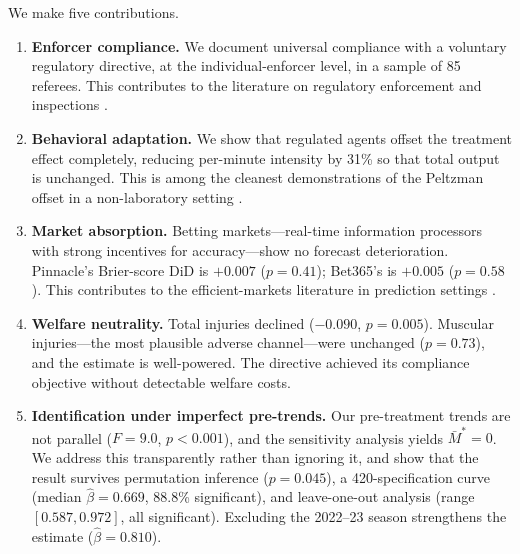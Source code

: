 We make five contributions.
%
\begin{enumerate}[label=(\roman*)]

\item \textbf{Enforcer compliance.}
We document universal compliance with a voluntary regulatory directive,
at the individual-enforcer level, in a sample of 85 referees.
This contributes to the literature on regulatory enforcement and
inspections \citep{DufloGreenstoneHanna2013,DimantTosato2018}.

\item \textbf{Behavioral adaptation.}
We show that regulated agents offset the treatment effect completely,
reducing per-minute intensity by 31\% so that total output is unchanged.
This is among the cleanest demonstrations of the Peltzman offset
in a non-laboratory setting \citep{Peltzman1975,VisscherSi1997}.

\item \textbf{Market absorption.}
Betting markets---real-time information processors with strong
incentives for accuracy---show no forecast deterioration.
Pinnacle's Brier-score DiD is $+0.007$ ($p=0.41$); Bet365's is
$+0.005$ ($p=0.58$).
This contributes to the efficient-markets literature in prediction
settings \citep{Thaler1988,GilMollaPazZone2019}.

\item \textbf{Welfare neutrality.}
Total injuries declined ($-0.090$, $p=0.005$).
Muscular injuries---the most plausible adverse channel---were
unchanged ($p=0.73$), and the estimate is well-powered.
The directive achieved its compliance objective without detectable
welfare costs.

\item \textbf{Identification under imperfect pre-trends.}
Our pre-treatment trends are not parallel ($F=9.0$, $p<0.001$),
and the \citet{RambachanRoth2023} sensitivity analysis yields
$\bar{M}^{*}=0$.
We address this transparently rather than ignoring it, and show
that the result survives permutation inference ($p=0.045$), a
420-specification curve (median $\hat{\beta}=0.669$,
88.8\% significant), and leave-one-out analysis
(range $[0.587, 0.972]$, all significant).
Excluding the 2022--23 season strengthens the estimate
($\hat{\beta}=0.810$).

\end{enumerate}

